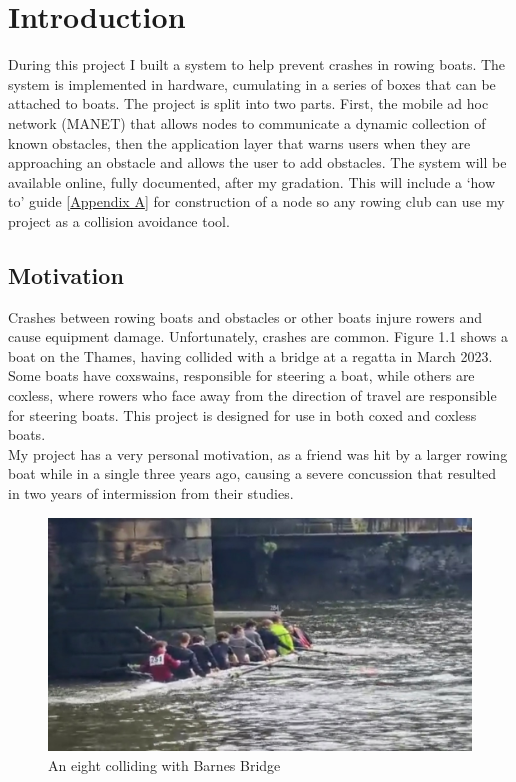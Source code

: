 \documentclass[12pt,a4paper]{report}
\newcommand{\newchapter}[2]{
    \setcounter{chapter}{#1}
    \setcounter{section}{0}
    \chapter*{#2}
    \addcontentsline{toc}{chapter}{#1 #2}
}
\begin{document}
{
\hypersetup{linkcolor=black}
\tableofcontents
}

\newchapter{1}{Introduction}
During this project I built a system to help prevent crashes in rowing boats. The system is implemented in hardware, cumulating in a series of boxes that can be attached to boats. The project is split into two parts. First, the mobile ad hoc network (MANET) that allows nodes to communicate a dynamic collection of known obstacles, then the application layer that warns users when they are approaching an obstacle and allows the user to add obstacles. The system will be available online, fully documented, after my gradation. This will include a `how to' guide [\hyperref[appendixA]{Appendix A}] for construction of a node so any rowing club can use my project as a collision avoidance tool.    

\section{Motivation}	
Crashes between rowing boats and obstacles or other boats injure rowers and cause equipment damage. Unfortunately, crashes are common. Figure 1.1 shows a boat on the Thames, having collided with a bridge at a regatta in March 2023. Some boats have coxswains, responsible for steering a boat, while others are coxless, where rowers who face away from the direction of travel are responsible for steering boats. This project is designed for use in both coxed and coxless boats. \\
My project has a very personal motivation, as a friend was hit by a larger rowing boat while in a single three years ago, causing a severe concussion that resulted in two years of intermission from their studies.
\begin{figure}[h]
\begin{center}
\includegraphics[scale=0.5]{boatCrash.jpg.png}
\end{center}
\caption{An eight colliding with Barnes Bridge \cite{boat}}
\end{figure}
\FloatBarrier
\end{document}
